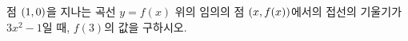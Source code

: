 점 $(1{,}\mkern3mu\mathopen{}0)$을 지나는 곡선 $y=f(x)$ 위의 임의의 점 $(x{,}\mkern3mu\mathopen{}f(x))$에서의 접선의 기울기가 $3x^2-1$일 때, $f(3)$의 값을 구하시오.
